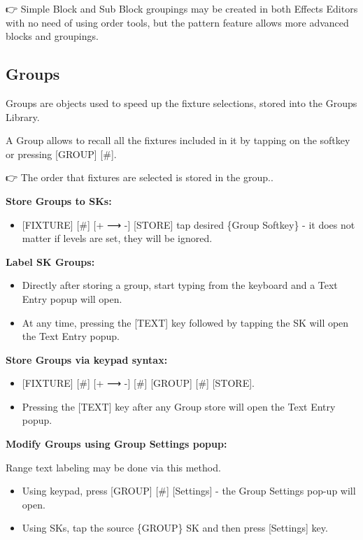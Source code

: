 \documentclass[
]{article}
\providecommand{\tightlist}{%
  \setlength{\itemsep}{0pt}\setlength{\parskip}{0pt}}
\begin{document}
👉 Simple Block and Sub Block groupings may be created in both Effects Editors with no need of using order tools, but the pattern feature allows more advanced blocks and groupings.

\hypertarget{Groups-6.4}{%
\subsection{Groups}\label{Groups-6.4}}

Groups are objects used to speed up the fixture selections, stored into the Groups Library.

A Group allows to recall all the fixtures included in it by tapping on the softkey or pressing {[}GROUP{]} {[}\#{]}.

👉 {The order that fixtures are selected is stored in the group.}.

\textbf{Store Groups to SKs:}

\begin{itemize}
\tightlist
\item
  {[}FIXTURE{]} {[}\#{]} {[}+ ⟶ -{]} {[}STORE{]} tap desired \{Group Softkey\} - it does not matter if levels are set, they will be ignored.
\end{itemize}

\textbf{Label SK Groups:}

\begin{itemize}
\item
  Directly after storing a group, start typing from the keyboard and a Text Entry popup will open.
\item
  At any time, pressing the {[}TEXT{]} key followed by tapping the SK will open the Text Entry popup.
\end{itemize}

\textbf{Store Groups via keypad syntax:}

\begin{itemize}
\item
  {[}FIXTURE{]} {[}\#{]} {[}+ ⟶ -{]} {[}\#{]} {[}GROUP{]} {[}\#{]} {[}STORE{]}.
\item
  Pressing the {[}TEXT{]} key after any Group store will open the Text Entry popup.
\end{itemize}

\textbf{Modify Groups using Group Settings popup:}

Range text labeling may be done via this method.

\begin{itemize}
\item
  Using keypad, press {[}GROUP{]} {[}\#{]} {[}Settings{]} - the Group Settings pop-up will open.
\item
  Using SKs, tap the source \{GROUP\} SK and then press {[}Settings{]} key.
\end{itemize}
\end{document}
